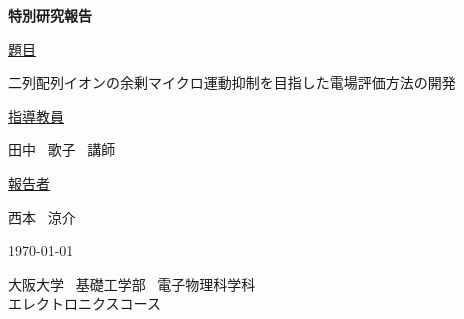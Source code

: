 \begin{titlepage}
	\begin{center}
		\vspace{25truemm}
		{\huge \bf{特別研究報告}\par}
		\vspace{10truemm}
		{\huge \underline{題目}\par}
		\vspace{5truemm}
		{\huge 二列配列イオンの余剰マイクロ運動抑制を目指した電場評価方法の開発\par}
		\vspace{15truemm}
		{\huge \underline{指導教員}\par}
		\vspace{5truemm}
		{\huge 田中 \ 歌子 \ 講師\par}
		\vspace{15truemm}
		{\huge \underline{報告者}\par}
		\vspace{5truemm}
		{\huge 西本 \ 涼介\par}
		\vspace{15truemm}
		{\huge \today\par}
		\vspace{15truemm}
		{\huge 大阪大学 \ 基礎工学部 \ 電子物理科学科 \\ エレクトロニクスコース}
	\end{center}
\end{titlepage}
